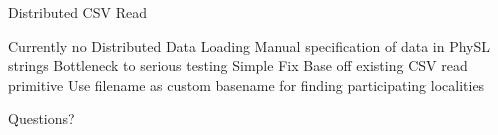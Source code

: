 \documentclass[10pt]{beamer}
\begin{document}
\begin{frame}{Distributed CSV Read}
\begin{outline}
	\1 Currently no Distributed Data Loading
		\2 Manual specification of data in PhySL strings
	\1 Bottleneck to serious testing
	\1 Simple Fix
		\2 Base off existing CSV read primitive
		\2 Use filename as custom basename for finding participating localities
\end{outline}
\end{frame}

\begin{frame}[standout]
	Questions?
\end{frame}
\end{document}

